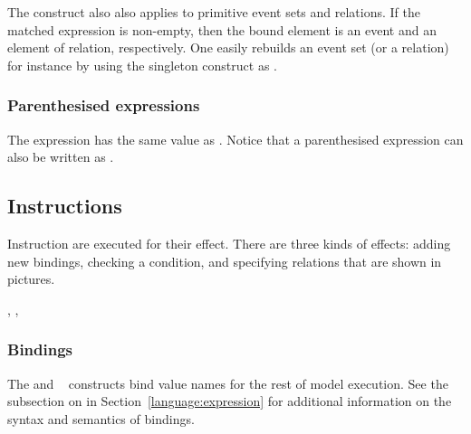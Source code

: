 The construct also also applies to primitive event sets and relations.
If the matched expression is non-empty, then the bound element is an event
and an element of relation, respectively. One easily rebuilds an event set
(or a relation) for instance by using the singleton construct as
.

\subsubsection*{Parenthesised expressions}
The expression 
has the same value as .
Notice that a parenthesised expression
can also be written as  .

\subsection{\label{language:instruction}Instructions}
Instruction are executed for their  effect.
There are three kinds of effects: adding new bindings,
checking a condition, and specifying relations that are shown in pictures.
\begin{syntax}
 \is{}   \boption{}  \eoption {} \brepet{}   \erepet{}
\alt \boption {} \eoption {}  \boption {} \eoption
\alt {}  \T{=} \boption \T{||} 
\brepet \T{||}  \erepet
\alt {}   \T{=} \brepet {} \erepet {}
\alt {}    \boption {} \eoption
\alt {}   
\alt {}  \brepet \T{,}  \erepet
\alt {}  \brepet \T{,}  \erepet
\alt {}     \brepet{}  \erepet {}
\alt {}   
\alt {} 
\sep
{} \is {} \orelse \T{\textasciitilde} 
\sep
{} \is {} \orelse {} \orelse {}
\end{syntax}

\subsubsection*{Bindings}
The  and ~ constructs bind value names for the rest
of model execution.
See the subsection on 
in Section~\ref{language:expression}
for additional information on the syntax and semantics of bindings.


